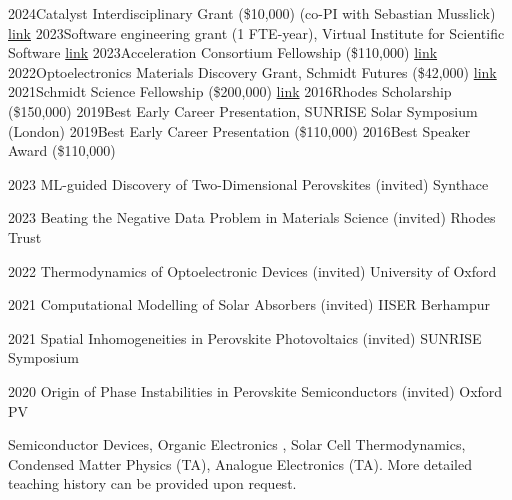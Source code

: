 \documentclass{scrartcl}
\begin{document}
\begin{entrylist}
{2024}{Catalyst Interdisciplinary Grant (\$10,000) (co-PI with Sebastian Musslick) \href{https://schmidtsciencefellows.org/news/2023-catalyst-grants-awardees/}{link} }{}
{2023}{Software engineering grant (1 FTE-year), Virtual Institute for Scientific Software \href{https://www.schmidtfutures.com/our-work/virtual-institute-for-scientific-software/}{link} }{}
{2023}{Acceleration Consortium Fellowship (\$110,000) \href{https://acceleration.utoronto.ca/}{link} }{}
{2022}{Optoelectronics Materials Discovery Grant, Schmidt Futures (\$42,000) \href{https://www.schmidtfutures.com/}{link} }{}
{2021}{Schmidt Science Fellowship (\$200,000) \href{https://schmidtsciencefellows.org/}{link} }{}
{2016}{Rhodes Scholarship (\$150,000)}{}
{2019}{Best Early Career Presentation, SUNRISE Solar Symposium (London)}{}
{2019}{Best Early Career Presentation (\$110,000)}{}
{2016}{Best Speaker Award (\$110,000)}{}
\end{entrylist} 


\begin{entrylist}

\splitentry
{2023}
{ML-guided Discovery of Two-Dimensional Perovskites (invited)}
{Synthace}{}

\splitentry
{2023}
{Beating the Negative Data Problem in Materials Science (invited)}
{Rhodes Trust}{}

\splitentry
{2022}
{Thermodynamics of Optoelectronic Devices (invited)}
{University of Oxford}{}

\splitentry
{2021}
{Computational Modelling of Solar Absorbers (invited)}
{IISER Berhampur}{}

\splitentry
{2021}
{Spatial Inhomogeneities in Perovskite Photovoltaics (invited)}
{SUNRISE Symposium}{}

\splitentry
{2020}
{Origin of Phase Instabilities in Perovskite Semiconductors (invited)}
{Oxford PV}{}




\end{entrylist}



Semiconductor Devices, Organic Electronics , Solar Cell Thermodynamics, Condensed Matter Physics (TA), Analogue Electronics (TA). More detailed teaching history can be provided upon request.\bigskip
\end{document}

